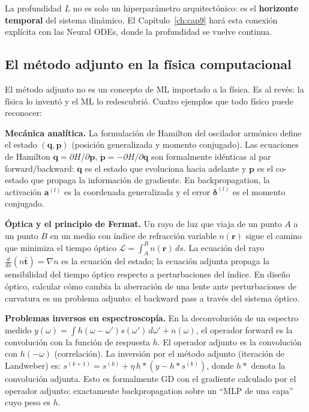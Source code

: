 La profundidad $L$ no es solo un hiperparámetro arquitectónico: es el
\textbf{horizonte temporal} del sistema dinámico. El
Capítulo~\ref{ch:cap9} hará esta conexión explícita con las Neural ODEs,
donde la profundidad se vuelve continua.

\subsection{El método adjunto en la física computacional}
\label{subsec:adjunto_fisica}

El método adjunto no es un concepto de ML importado a la física. Es al
revés: la física lo inventó y el ML lo redescubrió. Cuatro ejemplos que
todo físico puede reconocer:

\textbf{Mecánica analítica.}
La formulación de Hamilton del oscilador armónico define el estado
$(\bm{q}, \bm{p})$ (posición generalizada y momento conjugado). Las
ecuaciones de Hamilton $\dot{\bm{q}} = \partial H/\partial\bm{p}$,
$\dot{\bm{p}} = -\partial H/\partial\bm{q}$ son formalmente idénticas al
par forward/backward: $\bm{q}$ es el estado que evoluciona hacia adelante
y $\bm{p}$ es el co-estado que propaga la información de gradiente. En
backpropagation, la activación $\bm{a}^{(l)}$ es la coordenada
generalizada y el error $\bm{\delta}^{(l)}$ es el momento conjugado.

\textbf{Óptica y el principio de Fermat.}
Un rayo de luz que viaja de un punto $A$ a un punto $B$ en un medio con
índice de refracción variable $n(\bm{r})$ sigue el camino que minimiza
el tiempo óptico $\mathcal{L} = \int_A^B n(\bm{r})\,ds$. La ecuación
del rayo $\frac{d}{ds}(n\hat{\bm{t}}) = \nabla n$ es la ecuación del
estado; la ecuación adjunta propaga la sensibilidad del tiempo óptico
respecto a perturbaciones del índice. En diseño óptico, calcular cómo
cambia la aberración de una lente ante perturbaciones de curvatura es un
problema adjunto: el backward pass a través del sistema óptico.

\textbf{Problemas inversos en espectroscopía.}
En la deconvolución de un espectro medido
$y(\omega) = \int h(\omega-\omega')s(\omega')\,d\omega' + n(\omega)$, el
operador forward es la convolución con la función de respuesta $h$. El
operador adjunto es la convolución con $h(-\omega)$ (correlación). La
inversión por el método adjunto (iteración de Landweber) es:
$s^{(k+1)} = s^{(k)} + \eta\, h * (y - h * s^{(k)})$, donde $h *$
denota la convolución adjunta. Esto es formalmente GD con el gradiente
calculado por el operador adjunto: exactamente backpropagation sobre un
``MLP de una capa'' cuyo peso es $h$.

